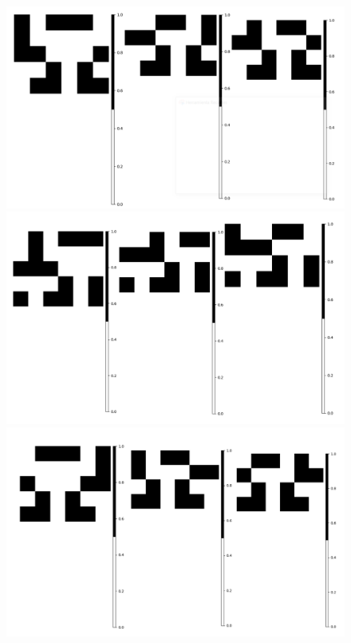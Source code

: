\documentclass[11pt]{article}
\begin{document}
			\begin{figure}[H]
			\centering
			\includegraphics[scale=0.3]{resources/Atractores22/atractor_22_size_6_res.png}
			\includegraphics[scale=0.3]{resources/Atractores22/atractor_22_size_6_res2.png}
			\includegraphics[scale=0.3]{resources/Atractores22/atractor_22_size_6_res5.png}

\end{figure}
\end{document}
